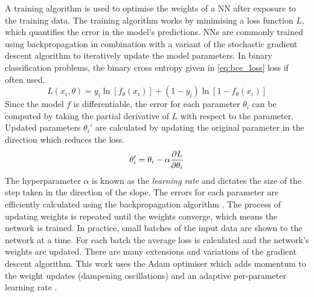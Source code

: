 A training algorithm is used to optimise the weights of a NN after exposure to the training data.
The training algorithm works by minimising a loss function $L$, which quantifies the error in the model's predictions.
NNs are commonly trained using backpropagation in combination with a variant of the stochastic gradient descent algorithm to iteratively update the model parameters.
In binary classification problems, the binary cross entropy given in \cref{eq:bce_loss} loss if often used.
%
\begin{equation}\label{eq:bce_loss}
  L(x_i, \theta) = y_i \ln[f_\theta(x_i)] + (1 - y_i) \ln[1 - f_\theta(x_i)]
\end{equation}
%
Since the model $f$ is differentiable, the error for each parameter $\theta_i$ can be computed by taking the partial derivative of $L$ with respect to the parameter.
Updated parameters $\theta_i'$ are calculated by updating the original parameter in the direction which reduces the loss.
%
\begin{equation}\label{eq:weight_update}
  \theta_i' = \theta_i - \alpha \frac{\partial {L}}{\partial \theta_i}
\end{equation}
%
The hyperparameter $\alpha$ is known as the \textit{learning rate} and dictates the size of the step taken in the direction of the slope. 
The errors for each parameter are efficiently calculated using the backpropagation algorithm \cite{rumelhart1986learning}.
The process of updating weights is repeated until the weights converge, which means the network is trained.
In practice, small batches of the input data are shown to the network at a time. For each batch the average loss is calculated and the network's weights are updated.
There are many extensions and variations of the gradient descent algorithm.
This work uses the Adam optimiser which adds momentum to the weight updates (dampening oscillations) and an adaptive per-parameter learning rate \cite{2014arXiv1412.6980K}.

